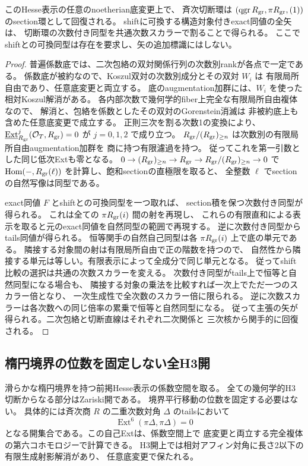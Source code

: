 \begin{proposition}\label{prop:cubic-CY-three-alpha-relative-section-arrows}
このHesse表示の任意のnoetherian底変更上で、
斉次切断環は $(\operatorname{qgr} R_{\rm gr},\pi R_{\rm gr},(1))$ のsection環として回復される。
shiftに可換する構造対象付きexact同値の全矢は、
切断環の次数付き同型を共通次数スカラーで割ることで得られる。
ここでshiftとの可換同型は存在を要求し、矢の追加標識にはしない。
\end{proposition}
\begin{proof}
普遍係数底では、二次包絡の双対関係行列の次数別rankが各点で一定である。
係数底が被約なので、Koszul双対の次数別成分とその双対 $W_i$ は
有限局所自由であり、任意底変更と両立する。
底のaugmentation加群には、$W_i$ を使った相対Koszul解消がある。
各内部次数で幾何学的fiber上完全な有限局所自由複体なので、
解消と、包絡を係数としたその双対のGorenstein消滅は
非被約底上も含めた任意底変更で成立する。
正則三次を割る次数1の変換により、
$\underline{\operatorname{Ext}}^j_{R_{\rm gr}}(\mathcal O_T,R_{\rm gr})=0$
が $j=0,1,2$ で成り立つ。
$R_{\rm gr}/(R_{\rm gr})_{\ge n}$ は次数別の有限局所自由augmentation加群を
商に持つ有限濾過を持つ。
従ってこれを第一引数とした同じ低次Extも零となる。
$0\to (R_{\rm gr})_{\ge n}\to R_{\rm gr}\to R_{\rm gr}/(R_{\rm gr})_{\ge n}\to0$
で $\operatorname{Hom}(-,R_{\rm gr}(\ell))$ を計算し、飽和sectionの直極限を取ると、
全整数 $\ell$ でsectionの自然写像は同型である。

exact同値 $F$ とshiftとの可換同型を一つ取れば、
section積を保つ次数付き同型が得られる。
これは全ての $\pi R_{\rm gr}(i)$ 間の射を再現し、
これらの有限直和による表示を取ると元のexact同値を自然同型の範囲で再現する。
逆に次数付き同型からtails同値が得られる。
恒等関手の自然自己同型は各 $\pi R_{\rm gr}(i)$ 上で底の単元である。
隣接する対象間の射は有限局所自由で正の階数を持つので、
自然性から隣接する単元は等しい。有限表示によって全成分で同じ単元となる。
従ってshift比較の選択は共通の次数スカラーを変える。
次数付き同型がtails上で恒等と自然同型になる場合も、
隣接する対象の乗法を比較すれば一次上でただ一つのスカラー倍となり、
一次生成性で全次数のスカラー倍に限られる。
逆に次数スカラーは各次数への同じ倍率の累乗で恒等と自然同型になる。
従って主張の矢が得られる。二次包絡と切断直線はそれぞれ二次関係と
三次核から関手的に回復される。
\end{proof}

\subsection{楕円境界の位数を固定しない全H3開}
\begin{theorem}\label{thm:h3-elliptic-mixed-order-projective-open}
滑らかな楕円境界を持つ前掲Hesse表示の係数空間を取る。
全ての幾何学的H3切断からなる部分はZariski開である。
境界平行移動の位数を固定する必要はない。
具体的には斉次商 $R$ の二重次数対角 $\Delta$ のtailsにおいて
\[
 \operatorname{Ext}^6(\pi\Delta,\pi\Delta)=0
\]
となる開集合である。この自己Extは、係数空間上で
底変更と両立する完全複体の第六コホモロジーで計算できる。
H3開上では相対アフィン対角に長さ2以下の有限生成射影解消があり、
任意底変更で保たれる。
\end{theorem}

